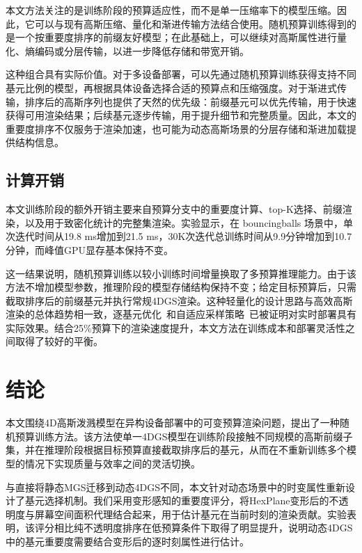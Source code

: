\documentclass[sn-mathphys]{sn-jnl}
\begin{document}
本文方法关注的是训练阶段的预算适应性，而不是单一压缩率下的模型压缩。因此，它可以与现有高斯压缩、量化和渐进传输方法结合使用。随机预算训练得到的是一个按重要度排序的前缀友好模型；在此基础上，可以继续对高斯属性进行量化、熵编码或分层传输，以进一步降低存储和带宽开销。

这种组合具有实际价值。对于多设备部署，可以先通过随机预算训练获得支持不同基元比例的模型，再根据具体设备选择合适的预算点和压缩强度。对于渐进式传输，排序后的高斯序列也提供了天然的优先级：前缀基元可以优先传输，用于快速获得可用渲染结果；后续基元逐步传输，用于提升细节和完整质量。因此，本文的重要度排序不仅服务于渲染加速，也可能为动态高斯场景的分层存储和渐进加载提供结构信息。

\subsection{计算开销}

本文训练阶段的额外开销主要来自预算分支中的重要度计算、top-K选择、前缀渲染，以及用于致密化统计的完整集渲染。实验显示，在 bouncingballs 场景中，单次迭代时间从19.8 ms增加到21.5 ms，30K次迭代总训练时间从9.9分钟增加到10.7分钟，而峰值GPU显存基本保持不变。

这一结果说明，随机预算训练以较小训练时间增量换取了多预算推理能力。由于该方法不增加模型参数，推理阶段的模型存储结构保持不变；给定目标预算后，只需截取排序后的前缀基元并执行常规4DGS渲染。这种轻量化的设计思路与高效高斯渲染的总体趋势相一致，逐基元优化~\cite{zhang2026dho3dgs}和自适应采样策略~\cite{xu2024efficient}已被证明对实时部署具有实际效果。结合25\%预算下的渲染速度提升，本文方法在训练成本和部署灵活性之间取得了较好的平衡。

\section{结论}
\label{sec:conclusion}

本文围绕4D高斯泼溅模型在异构设备部署中的可变预算渲染问题，提出了一种随机预算训练方法。该方法使单一4DGS模型在训练阶段接触不同规模的高斯前缀子集，并在推理阶段根据目标预算直接截取排序后的基元，从而在不重新训练多个模型的情况下实现质量与效率之间的灵活切换。

与直接将静态MGS迁移到动态4DGS不同，本文针对动态场景中的时变属性重新设计了基元选择机制。我们采用变形感知的重要度评分，将HexPlane变形后的不透明度与屏幕空间面积代理结合起来，用于估计基元在当前时刻的渲染贡献。实验表明，该评分相比纯不透明度排序在低预算条件下取得了明显提升，说明动态4DGS中的基元重要度需要结合变形后的逐时刻属性进行估计。
\end{document}
